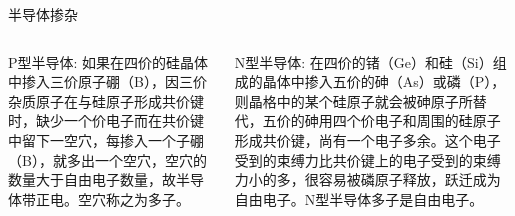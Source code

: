 \documentclass[trans]{beamer} %
\begin{document}
\begin{frame}{半导体掺杂}

    \begin{columns}
        \begin{column}{0.5\textwidth}
        
        \begin{exampleblock}{P型半导体:}
        如果在四价的硅晶体中掺入三价原子硼（B），因三价杂质原子在与硅原子形成共价键时，缺少一个价电子而在共价键中留下一空穴，每掺入一个子硼（B），就多出一个空穴，空穴的数量大于自由电子数量，故半导体带正电。\alert{空穴称之为多子}。
        
      \end{exampleblock}
             
        \end{column}
        \begin{column}{0.5\textwidth}
        \begin{exampleblock}{N型半导体:}
      在四价的锗（Ge）和硅（Si）组成的晶体中掺入五价的砷（As）或磷（P），则晶格中的某个硅原子就会被砷原子所替代，五价的砷用四个价电子和周围的硅原子形成共价键，尚有一个电子多余。这个电子受到的束缚力比共价键上的电子受到的束缚力小的多，很容易被磷原子释放，跃迁成为自由电子。N型半导体\alert{多子是自由电子}。

      \end{exampleblock}
        
        \end{column}
        \end{columns}
\end{frame} 
\end{document}
